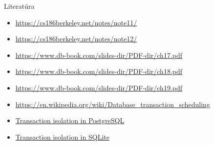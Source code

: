 \documentclass[12pt]{beamer}
\begin{document}
\begin{frame}{Literatúra}
\begin{itemize}
\item {\scriptsize\url{https://cs186berkeley.net/notes/note11/}}
\item {\scriptsize\url{https://cs186berkeley.net/notes/note12/}}
\item {\scriptsize\url{https://www.db-book.com/slides-dir/PDF-dir/ch17.pdf}}
\item {\scriptsize\url{https://www.db-book.com/slides-dir/PDF-dir/ch18.pdf}}
\item {\scriptsize\url{https://www.db-book.com/slides-dir/PDF-dir/ch19.pdf}}
\item {\scriptsize\url{https://en.wikipedia.org/wiki/Database_transaction_scheduling}}
\item {\scriptsize\href{https://www.postgresql.org/docs/current/mvcc.html}{Transaction isolation in PostgreSQL}}
\item {\scriptsize\href{https://www.sqlite.org/isolation.html}{Transaction isolation in SQLite}}
\end{itemize}
\end{frame}
\end{document}
